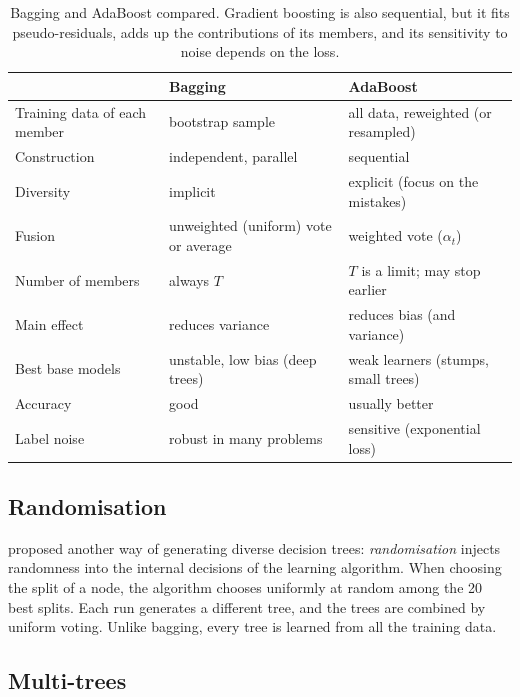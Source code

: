 \begin{table}[htbp]
\centering\small
\caption{Bagging and AdaBoost compared. Gradient boosting is also sequential, but it fits
pseudo-residuals, adds up the contributions of its members, and its sensitivity to noise depends on
the loss.}\label{tab:bagboost}
\begin{tabularx}{\textwidth}{@{}>{\raggedright\arraybackslash}p{3.2cm}XX@{}}
\toprule
& Bagging & AdaBoost\\
\midrule
Training data of each member & bootstrap sample & all data, reweighted (or resampled)\\
Construction & independent, parallel & sequential\\
Diversity & implicit & explicit (focus on the mistakes)\\
Fusion & unweighted (uniform) vote or average & weighted vote ($\alpha_t$)\\
Number of members & always $T$ & $T$ is a limit; may stop earlier\\
Main effect & reduces variance & reduces bias (and variance)\\
Best base models & unstable, low bias (deep trees) & weak learners (stumps, small trees)\\
Accuracy & good & usually better\\
Label noise & robust in many problems & sensitive (exponential loss)\\
\bottomrule
\end{tabularx}
\end{table}

\subsection{Randomisation}

\citet{dietterich2000experimental} proposed another way of generating diverse decision
trees: \emph{randomisation} injects randomness into the internal decisions of the learning
algorithm. When choosing the split of a node, the algorithm chooses uniformly at random among the 20 best splits. Each run generates a different
tree, and the trees are combined by uniform voting. Unlike bagging, every tree is learned from
all the training data.

\subsection{Multi-trees\extsec}

